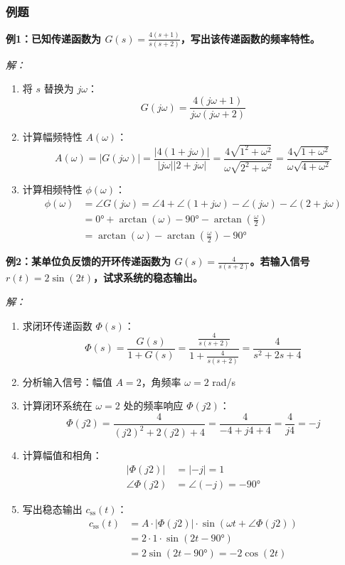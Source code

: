 \subsubsection{例题}

\textbf{例1：已知传递函数为 $G(s)=\frac{4(s+1)}{s(s+2)}$，写出该传递函数的频率特性。}

\textit{解：}
\begin{enumerate}
    \item 将 $s$ 替换为 $j\omega$：
    \[G(j\omega)=\frac{4(j\omega+1)}{j\omega(j\omega+2)}\]
    
    \item 计算幅频特性 $A(\omega)$：
    \[A(\omega) = |G(j\omega)| = \frac{|4(1+j\omega)|}{|j\omega||2+j\omega|} = \frac{4\sqrt{1^2+\omega^2}}{\omega\sqrt{2^2+\omega^2}} = \frac{4\sqrt{1+\omega^2}}{\omega\sqrt{4+\omega^2}}\]
    
    \item 计算相频特性 $\phi(\omega)$：
    \begin{align*}
    \phi(\omega) &= \angle G(j\omega) = \angle 4 + \angle(1+j\omega) - \angle(j\omega) - \angle(2+j\omega) \\
    &= 0° + \arctan(\omega) - 90° - \arctan(\frac{\omega}{2}) \\
    &= \arctan(\omega) - \arctan(\frac{\omega}{2}) - 90°
    \end{align*}
\end{enumerate}

\textbf{例2：某单位负反馈的开环传递函数为 $G(s)=\frac{4}{s(s+2)}$。若输入信号 $r(t)=2\sin(2t)$，试求系统的稳态输出。}

\textit{解：}
\begin{enumerate}
    \item 求闭环传递函数 $\Phi(s)$：
    \[\Phi(s) = \frac{G(s)}{1+G(s)} = \frac{\frac{4}{s(s+2)}}{1+\frac{4}{s(s+2)}} = \frac{4}{s^2+2s+4}\]
    
    \item 分析输入信号：幅值 $A=2$，角频率 $\omega=2$ rad/s
    
    \item 计算闭环系统在 $\omega=2$ 处的频率响应 $\Phi(j2)$：
    \[\Phi(j2) = \frac{4}{(j2)^2+2(j2)+4} = \frac{4}{-4+j4+4} = \frac{4}{j4} = -j\]
    
    \item 计算幅值和相角：
    \begin{align*}
    |\Phi(j2)| &= |-j| = 1 \\
    \angle\Phi(j2) &= \angle(-j) = -90°
    \end{align*}
    
    \item 写出稳态输出 $c_{\text{ss}}(t)$：
    \begin{align*}
    c_{\text{ss}}(t) &= A \cdot |\Phi(j2)| \cdot \sin(\omega t + \angle\Phi(j2)) \\
    &= 2 \cdot 1 \cdot \sin(2t - 90°) \\
    &= 2\sin(2t-90°) = -2\cos(2t)
    \end{align*}
\end{enumerate}

